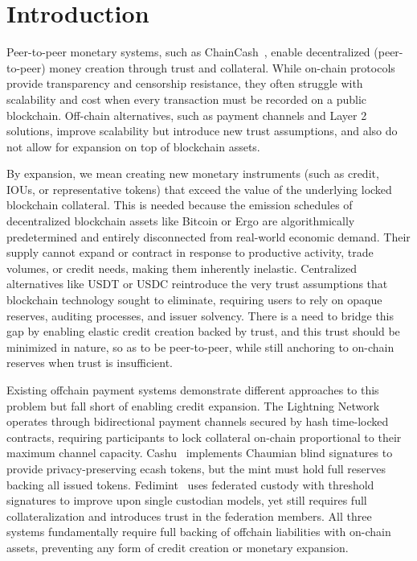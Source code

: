 \documentclass{ifcolog}
\newcommand{\cc}{ChainCash}
\begin{document}
\section{Introduction}

Peer-to-peer monetary systems, such as \cc{}~\cite{chaincash}, enable decentralized (peer-to-peer) money creation through trust and collateral. While on-chain protocols provide transparency and censorship resistance, they often struggle with scalability and cost when every transaction must be recorded on a public blockchain. Off-chain alternatives, such as payment channels and Layer 2 solutions, improve scalability but introduce new trust assumptions, and also do not allow for expansion on top of blockchain assets.

By expansion, we mean creating new monetary instruments (such as credit, IOUs, or representative tokens) that exceed the value of the underlying locked blockchain collateral. This is needed because the emission schedules of decentralized blockchain assets like Bitcoin or Ergo are algorithmically predetermined and entirely disconnected from real-world economic demand. Their supply cannot expand or contract in response to productive activity, trade volumes, or credit needs, making them inherently inelastic. Centralized alternatives like USDT or USDC reintroduce the very trust assumptions that blockchain technology sought to eliminate, requiring users to rely on opaque reserves, auditing processes, and issuer solvency. There is a need to bridge this gap by enabling elastic credit creation backed by trust, and this trust should be minimized in nature, so as to be peer-to-peer, while still anchoring to on-chain reserves when trust is insufficient.

Existing offchain payment systems demonstrate different approaches to this problem but fall short of enabling credit expansion. The Lightning Network~\cite{poon2016bitcoin} operates through bidirectional payment channels secured by hash time-locked contracts, requiring participants to lock collateral on-chain proportional to their maximum channel capacity. Cashu~\cite{calle2023cashu} implements Chaumian blind signatures to provide privacy-preserving ecash tokens, but the mint must hold full reserves backing all issued tokens. Fedimint~\cite{elsworth2023fedimint} uses federated custody with threshold signatures to improve upon single custodian models, yet still requires full collateralization and introduces trust in the federation members. All three systems fundamentally require full backing of offchain liabilities with on-chain assets, preventing any form of credit creation or monetary expansion.
\end{document}

